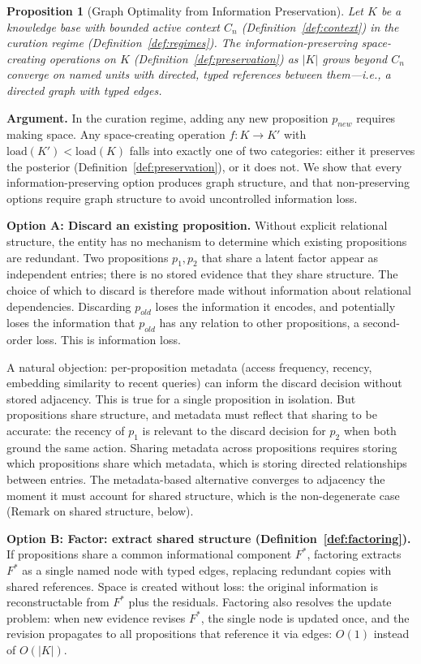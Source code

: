 \documentclass[11pt]{article}
\newtheorem{proposition}{Proposition}
\theoremstyle{definition}
\begin{document}
\begin{proposition}[Graph Optimality from Information Preservation]
\label{thm:graph-info}
Let $K$ be a knowledge base with bounded active context $C_n$
(Definition~\ref{def:context}) in the curation regime
(Definition~\ref{def:regimes}). The information-preserving
space-creating operations on $K$ (Definition~\ref{def:preservation}) as $|K|$
grows beyond $C_n$ converge on named units with directed,
typed references between them---i.e., a directed graph with typed edges.
\end{proposition}

\textbf{Argument.}
In the curation regime, adding any new proposition $p_{new}$ requires
making space. Any space-creating operation $f : K \to K'$ with
$\mathrm{load}(K') < \mathrm{load}(K)$ falls into exactly one of two categories: either it
preserves the posterior (Definition~\ref{def:preservation}), or it does
not. We show that every information-preserving option produces graph
structure, and that non-preserving options require graph structure to
avoid uncontrolled information loss.

\textbf{Option A: Discard an existing proposition.}
Without explicit relational structure, the entity has no mechanism to
determine which existing propositions are redundant. Two propositions
$p_1, p_2$ that share a latent factor appear as independent entries;
there is no stored evidence that they share structure. The choice of
which to discard is therefore made without information about relational
dependencies. Discarding $p_{old}$ loses the information it encodes, and
potentially loses the information that $p_{old}$ has any relation to
other propositions, a second-order loss. This is information loss.

A natural objection: per-proposition metadata (access frequency, recency,
embedding similarity to recent queries) can inform the discard decision
without stored adjacency. This is true for a single proposition in
isolation. But propositions share structure, and metadata must reflect
that sharing to be accurate: the recency of $p_1$ is relevant to the
discard decision for $p_2$ when both ground the same action. Sharing
metadata across propositions requires storing which propositions share
which metadata, which is storing directed relationships between entries.
The metadata-based alternative converges to adjacency the moment it
must account for shared structure, which is the non-degenerate case
(Remark on shared structure, below).

\textbf{Option B: Factor: extract shared structure
(Definition~\ref{def:factoring}).}
If propositions share a common informational component $F^*$, factoring
extracts $F^*$ as a single named node with typed edges, replacing
redundant copies with shared references. Space is created without loss:
the original information is reconstructable from $F^*$ plus the
residuals. Factoring also resolves the update problem: when new evidence
revises $F^*$, the single node is updated once, and the revision
propagates to all propositions that reference it via edges:
$O(1)$ instead of $O(|K|)$.
\end{document}

